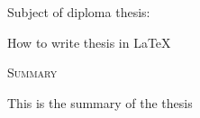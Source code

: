 \noindent
Subject of diploma thesis:

\noindent
How to write thesis in \LaTeX

\begin{center}
    \Large\textsc{Summary}
\end{center}

This is the summary of the thesis
